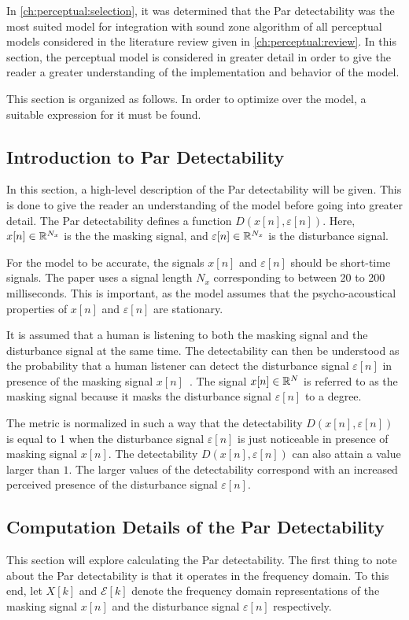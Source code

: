 In \autoref{ch:perceptual:selection}, it was determined that the Par detectability was the 
most suited model for integration with sound zone algorithm of all perceptual models considered in 
the literature review given in \autoref{ch:perceptual:review}.
In this section, the perceptual model is considered in greater detail in order to give the reader a greater
understanding of the implementation and behavior of the model.

This section is organized as follows.
In order to optimize over the model, a suitable expression for it must be found.

\subsection{Introduction to Par Detectability}
\label{ch:perceptual:implementation:intuition}
In this section, a high-level description of the Par detectability will be given.
This is done to give the reader an understanding of the model before going into greater detail.
The Par detectability defines a function $D(x[n],\varepsilon[n])$.
Here, $x[n]\in\mathbb{R}^{N_x}$ is the the masking signal, 
and $\varepsilon[n]\in\mathbb{R}^{N_x}$ is the disturbance signal.

For the model to be accurate, the signals $x[n]$ and $\varepsilon[n]$ should be short-time signals.
The paper uses a signal length $N_x$ corresponding to between 20 to 200 milliseconds.    
This is important, as the model assumes that the psycho-acoustical properties of $x[n]$ 
and $\varepsilon[n]$ are stationary.  

It is assumed that a human is listening to both the masking signal and the disturbance signal at the same time.
The detectability can then be understood as the probability that a human listener can detect the disturbance signal 
$\varepsilon[n]$ in presence of the masking signal $x[n]$~\cite{van2005perceptual}.
The signal $x[n]\in\mathbb{R}^{N}$ is referred to as the masking signal because it masks the disturbance signal 
$\varepsilon[n]$ to a degree.

The metric is normalized in such a way that the detectability $D(x[n],\varepsilon[n])$ is equal to 1 when the 
disturbance signal $\varepsilon[n]$ is just noticeable in presence of masking signal $x[n]$.
The detectability $D(x[n],\varepsilon[n])$ can also attain a value larger than $1$.
The larger values of the detectability correspond with an increased perceived presence of the
disturbance signal $\varepsilon[n]$.

\subsection{Computation Details of the Par Detectability}
\label{ch:perceptual:implementation:computation}
This section will explore calculating the Par detectability.
The first thing to note about the Par detectability is that it operates in the frequency domain. 
To this end, let $X[k]$ and $\mathcal{E}[k]$ denote the frequency domain representations of the masking signal $x[n]$ and 
the disturbance signal $\varepsilon[n]$ respectively.


